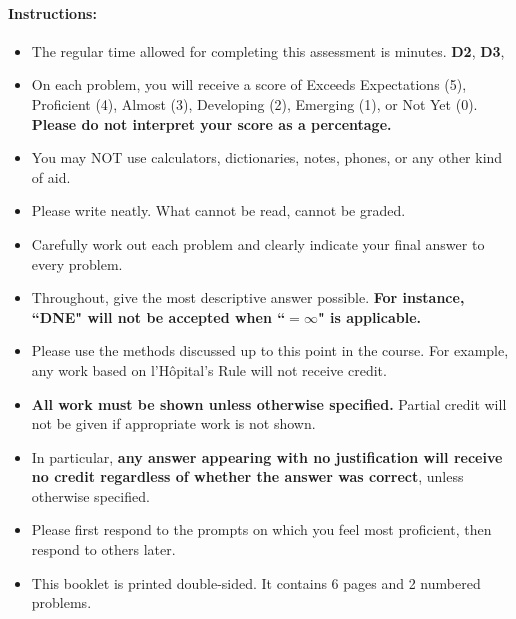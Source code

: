 \documentclass[11pt]{article}
\begin{document}
{%

\paragraph*{Instructions:}

\begin{itemize}
    
    \item The regular time allowed for completing this assessment is  minutes.
    {\bf\color{ForestGreen}D2}, 
    {\bf\color{ForestGreen}D3},
    \item On each problem, you will receive a score of Exceeds Expectations (5), Proficient (4), Almost (3), Developing (2), Emerging (1), or Not Yet (0). {\bf Please do not interpret your score as a percentage.}
    \item You may NOT use calculators, dictionaries, notes, phones, or any other kind of aid.
    \item Please write neatly. What cannot be read, cannot be graded.
    \item Carefully work out each problem and clearly indicate your final answer to every problem.
    \item Throughout, give the most descriptive answer possible. \textbf{For instance, ``DNE" will not be accepted when ``$=\infty$" is applicable.}
    \item Please use the methods discussed up to this point in the course. For example, any work based on l'H\^opital's Rule will not receive credit.
    \item \textbf{All work must be shown unless otherwise specified.} Partial credit will not be given if appropriate work is not shown.
    \item In particular, {\bf any answer appearing with no justification will receive no credit regardless of whether the answer was correct}, unless otherwise specified.
    \item Please first respond to the prompts on which you feel most proficient, then respond to others later.
    \item This booklet is printed double-sided. It contains 6 pages and 2 numbered problems.
    \end{itemize}
    
    }
\end{document}
